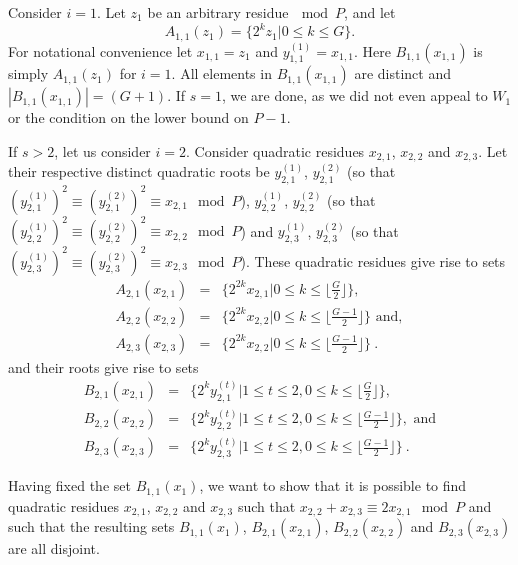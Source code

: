Consider $i=1$. Let $z_1$ be an arbitrary residue$~\mod P$, and
let \[A_{1,1}(z_1)=\{2^{k}z_1 | 0 \leq k \leq G \}.\] For
notational convenience let $x_{1,1}=z_1$ and
$y_{1,1}^{(1)}=x_{1,1}$. Here $B_{1,1}(x_{1,1})$ is simply
$A_{1,1}(z_1)$ for $i=1$. All elements in $B_{1,1}(x_{1,1})$ are
distinct and $|B_{1,1}(x_{1,1})| =(G+1)$. If $s=1$, we are done,
as we did not even appeal to $W_1$ or the condition on the lower
bound on $P-1$.

If $s>2$, let us consider $i=2$. Consider quadratic residues
$x_{2,1}$, $x_{2,2}$ and $x_{2,3}$. Let  their respective distinct
quadratic roots be $y_{2,1}^{(1)}$, $y_{2,1}^{(2)}$ (so that
$(y_{2,1}^{(1)})^2 \equiv (y_{2,1}^{(2)})^2 \equiv x_{2,1} \mod
P$), $y_{2,2}^{(1)}$, $y_{2,2}^{(2)}$ (so that $(y_{2,2}^{(1)})^2
\equiv (y_{2,2}^{(2)})^2 \equiv x_{2,2} \mod P$) and
$y_{2,3}^{(1)}$, $y_{2,3}^{(2)}$ (so that $(y_{2,3}^{(1)})^2
\equiv (y_{2,3}^{(2)})^2 \equiv x_{2,3} \mod P$). These quadratic
residues give rise to sets
\begin{eqnarray}
A_{2,1}(x_{2,1})&=&\{ 2^{2k}x_{2,1} | 0 \leq k \leq \lfloor
\frac{G}{2} \rfloor\},\\ A_{2,2}(x_{2,2})&=& \{ 2^{2k}x_{2,2} | 0
\leq k \leq \lfloor \frac{G-1}{2} \rfloor\} \text{ and},\\
A_{2,3}(x_{2,3})&=& \{ 2^{2k}x_{2,2} | 0 \leq k \leq \lfloor
\frac{G-1}{2} \rfloor\}~.
\end{eqnarray}
and their roots give rise to sets
\begin{eqnarray}
B_{2,1}(x_{2,1})&=&\{2^ky_{2,1}^{(t)} | 1 \leq t \leq 2, 0 \leq k
\leq \lfloor \frac{G}{2}\rfloor\},\\
B_{2,2}(x_{2,2})&=&\{2^ky_{2,2}^{(t)} | 1 \leq t \leq 2, 0 \leq k
\leq \lfloor \frac{G-1}{2}\rfloor\}, \text{ and}\\
B_{2,3}(x_{2,3})&=&\{2^ky_{2,3}^{(t)} | 1 \leq t \leq 2, 0 \leq k
\leq \lfloor \frac{G-1}{2}\rfloor\}~.
\end{eqnarray}


Having fixed the set $B_{1,1}(x_1)$, we want to show that it is
possible to find quadratic residues $x_{2,1}$, $x_{2,2}$ and
$x_{2,3}$ such that $x_{2,2} + x_{2,3} \equiv 2x_{2,1} \mod P$ and
such that the resulting sets $B_{1,1}(x_1)$, $B_{2,1}(x_{2,1})$,
$B_{2,2}(x_{2,2})$ and $B_{2,3}(x_{2,3})$ are all disjoint.

